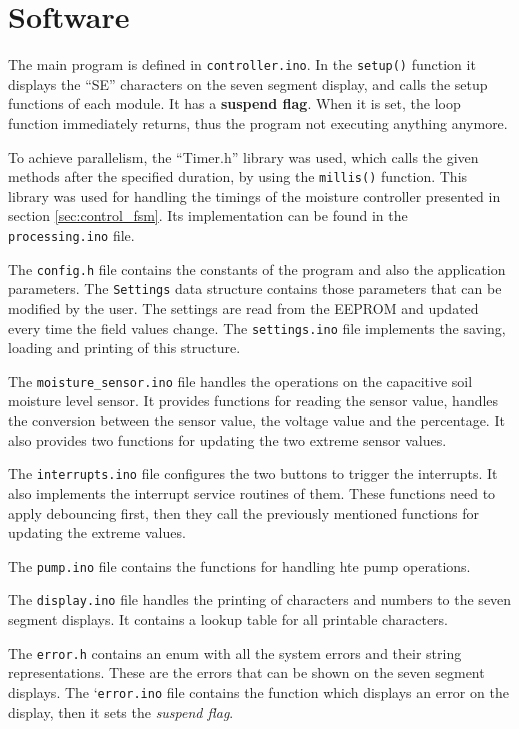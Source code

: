\section{Software}

The main program is defined in \verb|controller.ino|. In the \verb|setup()| function it displays the ``SE'' characters on the seven segment display, and calls the setup functions of each module. It has a \textbf{suspend flag}. When it is set, the loop function immediately returns, thus the program not executing anything anymore.

To achieve parallelism, the ``Timer.h'' library was used, which calls the given methods after the specified duration, by using the \verb|millis()| function. This library was used for handling the timings of the moisture controller presented in section \ref{sec:control_fsm}. Its implementation can be found in the \verb|processing.ino| file.

The \verb|config.h| file contains the constants of the program and also the application parameters. The \verb|Settings| data structure contains those parameters that can be modified by the user. The settings are read from the EEPROM and updated every time the field values change. The \verb|settings.ino| file implements the saving, loading and printing of this structure.

The \verb|moisture_sensor.ino| file handles the operations on the capacitive  soil moisture level sensor. It provides functions for reading the sensor value, handles the conversion  between the sensor value, the voltage value and the percentage. It also provides two functions for updating the two extreme sensor values.

The \verb|interrupts.ino| file configures the two buttons to trigger the interrupts. It also implements the interrupt service routines of them. These functions need to apply debouncing first, then they call the previously mentioned functions for updating the extreme values.

The \verb|pump.ino| file contains the functions for handling hte pump operations.

The \verb|display.ino| file handles the printing of characters and numbers to the seven segment displays. It contains a lookup table for all printable characters.

The \verb|error.h| contains an enum with all the system errors and their string representations. These are the errors that can be shown on the seven segment displays. The `\verb|error.ino| file contains the function which displays an error on the display, then it sets the \textit{suspend flag}.

